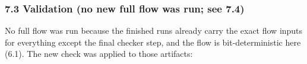 \begin{record}
\end{record}

\subsubsection{7.3 Validation (no new full flow was run; see 7.4)}\label{cr:defect:sky130-slew-cap-e45j:73-validation-no-new-full-flow-was-run-see-74}

\begin{record}

No full flow was run because the finished runs already carry the exact
flow inputs for everything except the final checker step, and the flow
is bit-deterministic here (6.1). The new check was applied to those
artifacts:

{\footnotesize\setlength{\tabcolsep}{3pt}

}
\end{record}
